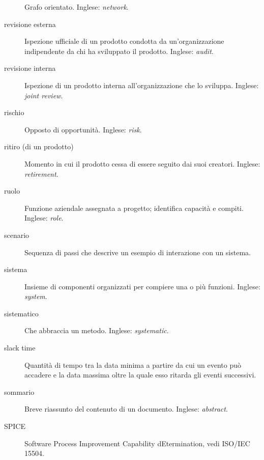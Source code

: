 \documentclass[a4paper]{article}
\begin{document}
\begin{description}
			Grafo orientato. Inglese: \emph{network}.
			
	\item[revisione esterna] 

			Ispezione ufficiale di un prodotto condotta da un'organizzazione indipendente da chi ha sviluppato il prodotto. Inglese: \emph{audit}.
			
	\item[revisione interna] 

			Ispezione di un prodotto interna all'organizzazione che lo sviluppa. Inglese: \emph{joint review}.
			
	\item[rischio] 

			Opposto di opportunità. Inglese: \emph{risk}.
			
	\item[ritiro (di un prodotto)] 

			Momento in cui il prodotto cessa di essere seguito dai suoi creatori. Inglese: \emph{retirement}.
			
	\item[ruolo] 

			Funzione aziendale assegnata a progetto; identifica capacità e compiti. Inglese: \emph{role}.
			
	\item[scenario] 

			Sequenza di passi che descrive un esempio di interazione con un sistema.
			
	\item[sistema] 

			Insieme di componenti organizzati per compiere una o più funzioni. Inglese: \emph{system}.
			
	\item[sistematico] 

			Che abbraccia un metodo. Inglese: \emph{systematic}.
			
	\item[slack time] 

			Quantità di tempo tra la data minima a partire da cui un evento può accadere e la data massima oltre la quale esso ritarda gli eventi successivi.
			
	\item[sommario] 

			Breve riassunto del contenuto di un documento. Inglese: \emph{abstract}.
			
	\item[SPICE] 

			Software Process Improvement Capability dEtermination, vedi ISO/IEC 15504.
			

\end{description}
\end{document}
